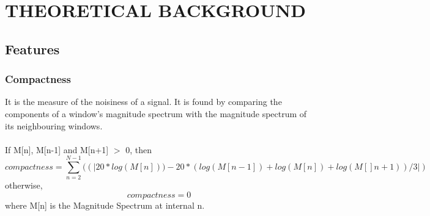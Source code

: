 \newpage
\section{THEORETICAL BACKGROUND}

\subsection{Features}

\subsubsection{Compactness}
It is the measure of the noisiness of a signal. It is found by comparing the 
components of a window’s magnitude spectrum with the magnitude spectrum of its  
neighbouring windows.\\ 
\\
If M[n], M[n-1] and M[n+1] $>$ 0, then
\begin{equation}
        compactness = \sum_{n=2}^{N-1}{((|20*log(M[n]))-20*(log(M[n-1])+log(M[n])+log(M[]n+1))/3|)}
\end{equation}
otherwise,
\begin{equation}
        compactness = 0
\end{equation}
where M[n] is the Magnitude Spectrum at internal n.

